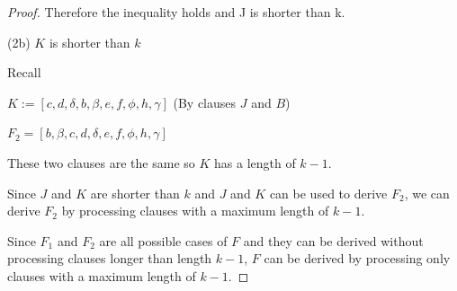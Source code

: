 \documentclass[manuscript]{acmart}
\begin{document}
\begin{proof}
        Therefore the inequality holds and J is shorter than k.

        (2b) $K$ is shorter than $k$

        Recall 
        
        $K := [c, d, \delta, b, \beta, e, f, \phi, h, \gamma]$ (By clauses $J$ and $B$)

        $F_2 = [b, \beta, c, d, \delta, e, f, \phi, h, \gamma]$

        These two clauses are the same so $K$ has a length of $k-1$.
        
        Since $J$ and $K$ are shorter than $k$ and $J$ and $K$ can be used
        to derive $F_2$, we can derive $F_2$ by processing clauses with a 
        maximum length of $k-1$.

        Since $F_1$ and $F_2$ are all possible cases of $F$ and they 
        can be derived without processing clauses longer than length
        $k-1$, $F$ can be derived by processing only clauses with
        a maximum length of $k-1$.
    \end{proof}
\end{document}
